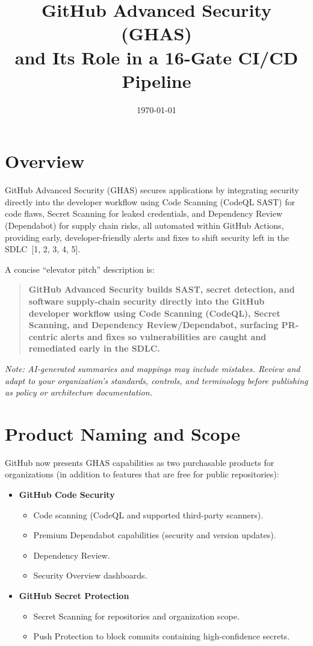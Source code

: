 \documentclass[11pt]{article}
\title{GitHub Advanced Security (GHAS)\\
and Its Role in a 16-Gate CI/CD Pipeline}
\author{}
\date{\today}
\begin{document}
\maketitle

\section{Overview}

GitHub Advanced Security (GHAS) secures applications by integrating security directly into the developer workflow using Code Scanning (CodeQL SAST) for code flaws, Secret Scanning for leaked credentials, and Dependency Review (Dependabot) for supply chain risks, all automated within GitHub Actions, providing early, developer-friendly alerts and fixes to shift security left in the SDLC~[1, 2, 3, 4, 5].

\medskip

A concise ``elevator pitch'' description is:

\begin{quote}
\textbf{GitHub Advanced Security builds SAST, secret detection, and software supply-chain security directly into the GitHub developer workflow using Code Scanning (CodeQL), Secret Scanning, and Dependency Review/Dependabot, surfacing PR-centric alerts and fixes so vulnerabilities are caught and remediated early in the SDLC.}
\end{quote}

\emph{Note: AI-generated summaries and mappings may include mistakes. Review and adapt to your organization's standards, controls, and terminology before publishing as policy or architecture documentation.}

\section{Product Naming and Scope}

GitHub now presents GHAS capabilities as two purchasable products for organizations (in addition to features that are free for public repositories):

\begin{itemize}[leftmargin=*]
  \item \textbf{GitHub Code Security}
    \begin{itemize}
      \item Code scanning (CodeQL and supported third-party scanners).
      \item Premium Dependabot capabilities (security and version updates).
      \item Dependency Review.
      \item Security Overview dashboards.
    \end{itemize}

  \item \textbf{GitHub Secret Protection}
    \begin{itemize}
      \item Secret Scanning for repositories and organization scope.
      \item Push Protection to block commits containing high-confidence secrets.
    \end{itemize}
\end{itemize}
\end{document}
